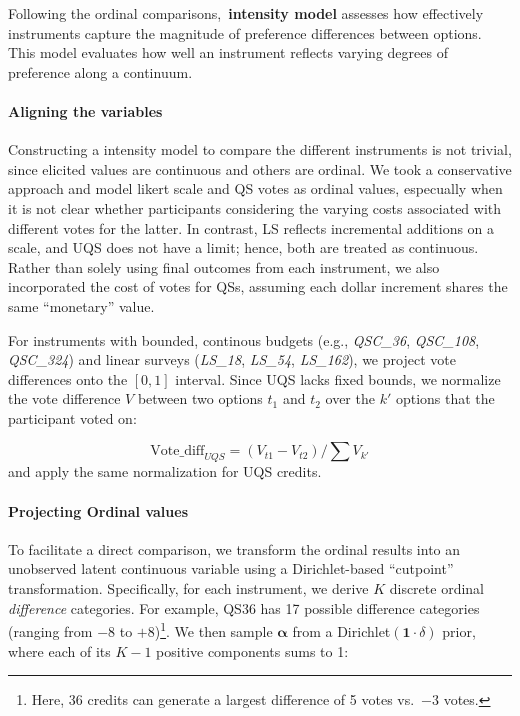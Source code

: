 Following the ordinal comparisons,~\textbf{intensity model} assesses how effectively instruments capture the magnitude of preference differences between options. This model evaluates how well an instrument reflects varying degrees of preference along a continuum.

\paragraph{Aligning the variables} Constructing a intensity model to compare the different instruments is not trivial, since elicited values are continuous and others are ordinal. We took a conservative approach and model likert scale and QS votes as ordinal values, especually when it is not clear whether participants considering the varying costs associated with different votes for the latter. In contrast, LS reflects incremental additions on a scale, and UQS does not have a limit; hence, both are treated as continuous. Rather than solely using final outcomes from each instrument, we also incorporated the cost of votes for QSs, assuming each dollar increment shares the same ``monetary'' value.

For instruments with bounded, continous budgets (e.g., \textit{QSC\_36}, \textit{QSC\_108}, \textit{QSC\_324}) and linear surveys (\textit{LS\_18}, \textit{LS\_54}, \textit{LS\_162}), we project vote differences onto the $[0,1]$ interval. Since UQS lacks fixed bounds, we normalize the vote difference $V$ between two options $t_1$ and $t_2$ over the $k'$ options that the participant voted on:

\begin{equation}
    \text{Vote\_diff}_{UQS} 
    = (V_{t1} - V_{t2})/\textstyle\sum V_{k'}
\end{equation}
and apply the same normalization for UQS credits.

\paragraph{Projecting Ordinal values} 
To facilitate a direct comparison, we transform the ordinal results into an unobserved latent continuous variable using a Dirichlet-based ``cutpoint'' transformation. Specifically, for each instrument, we derive $K$ discrete ordinal \emph{difference} categories. For example, QS36 has 17 possible difference categories (ranging from $-8$ to $+8$)\footnote{Here, 36 credits can generate a largest difference of 5 votes vs.\ $-3$ votes.}. We then sample
\(\boldsymbol{\alpha}\) from a Dirichlet$(\mathbf{1}\cdot\delta)$ prior, where each of its $K-1$ positive components sums to 1:

